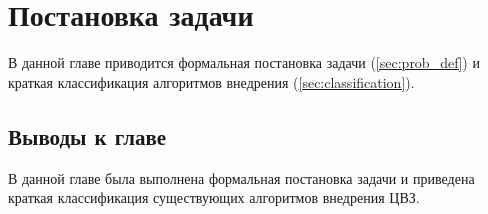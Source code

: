\chapter{Постановка задачи}

В данной главе приводится формальная постановка задачи (\ref{sec:prob_def}) и
краткая классификация алгоритмов внедрения (\ref{sec:classification}).




\section{Выводы к главе}
В данной главе была выполнена формальная постановка задачи и приведена краткая классификация существующих алгоритмов внедрения ЦВЗ.
